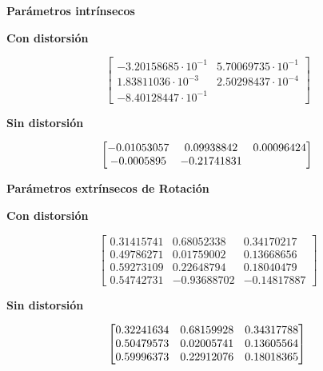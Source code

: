 \documentclass[11pt,a4paper]{article}
\theoremstyle{plain}
\theoremstyle{definition}
\begin{document}
\begin{center}
    {\LARGE \textbf{Parámetros intrínsecos}}
\end{center}
\begin{minipage}{0.5\textwidth}
\begin{center}
{\Large \textbf{Con distorsión}}
\end{center}
\begin{displaymath}
\left[
\begin{matrix}
-3.20158685 \cdot 10^{-1} &  5.70069735 \cdot 10^{-1} \\
1.83811036 \cdot 10^{-3} & 2.50298437 \cdot 10^{-4} \\
-8.40128447 \cdot 10^{-1}
\end{matrix}
\right] 
\end{displaymath}
\end{minipage}
\begin{minipage}{0.5\textwidth}
\begin{center}
{\Large \textbf{Sin distorsión}}
\end{center}
\begin{displaymath}
\left[
\begin{matrix}
-0.01053057 & 0.09938842 & 0.00096424 \\
-0.0005895 & -0.21741831
\end{matrix}
\right] \\
\end{displaymath}
\end{minipage}

\begin{center}
    {\LARGE \textbf{Parámetros extrínsecos de Rotación}}
\end{center}
\begin{minipage}{0.5\textwidth}
\begin{center}
{\Large \textbf{Con distorsión}}
\end{center}
\begin{displaymath}
\left[
\begin{matrix}
0.31415741 & 0.68052338 & 0.34170217 \\
0.49786271 & 0.01759002 & 0.13668656 \\
0.59273109 & 0.22648794 & 0.18040479 \\ 
0.54742731 & -0.93688702 & -0.14817887
\end{matrix}
\right] 
\end{displaymath}
\end{minipage}
\begin{minipage}{0.5\textwidth}
\begin{center}
{\Large \textbf{Sin distorsión}}
\end{center}
\begin{displaymath}
\left[
\begin{matrix}
0.32241634 & 0.68159928 & 0.34317788 \\
0.50479573 & 0.02005741 & 0.13605564 \\
0.59996373 & 0.22912076 & 0.18018365
\end{matrix}
\right] \\
\end{displaymath}
\end{minipage}
\end{document}
